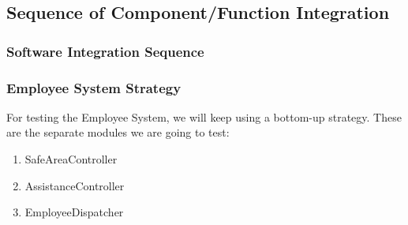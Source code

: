 \documentclass{article}
\begin{document}
\subsection{Sequence of Component/Function Integration}

\subsubsection{Software Integration Sequence}

\begin{Large}
\subsubsection{Employee System Strategy}
\end{Large}

For testing the Employee System, we will keep using a bottom-up strategy. These are the separate modules we are going to test: 
\begin{enumerate}
\item SafeAreaController
\item AssistanceController
\item EmployeeDispatcher
\end{enumerate}
\end{document}
